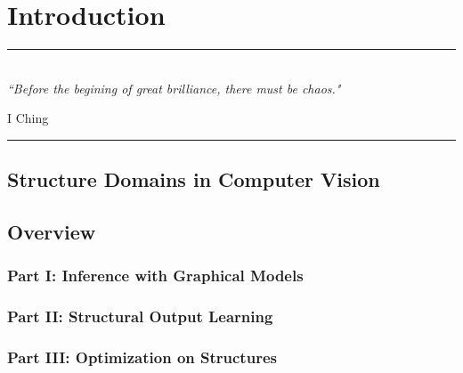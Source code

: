 
\chapter{Introduction} %
\label{Chapter1} %

\rule{\textwidth}{0.4pt} \\[0.5cm]
\textit{``Before the begining of great brilliance, there must be chaos."}

\begin{flushright}
I Ching
\end{flushright}
\rule{\textwidth}{0.4pt} 




\section{Structure Domains in Computer Vision}



\section{Overview}
\subsection{Part I: Inference with Graphical Models}
\subsection{Part II: Structural Output Learning}
\subsection{Part III: Optimization on Structures}

